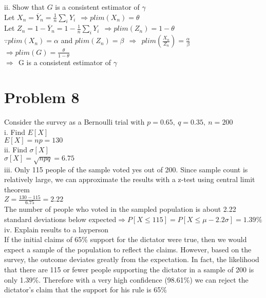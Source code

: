 \documentclass[11pt, oneside]{article}   	%
\begin{document}
ii. Show that $G$ is a consistent estimator of $\gamma$\\
Let $X_n=\overline{Y}_n=\frac{1}{n}\sum_i Y_i\ \ \Rightarrow plim(X_n)=\theta$\\
Let $Z_n=1-\overline{Y}_n=1-\frac{1}{n}\sum_i Y_i\ \ \Rightarrow plim(Z_n)=1-\theta$\\
\indent$\because plim(X_n)=\alpha$ and $plim(Z_n)=\beta\ \ \Rightarrow\ \ plim(\frac{X_n}{Z_n})=\frac{\alpha}{\beta}$\\
\indent$\Rightarrow plim(G)=\frac{\theta}{1-\theta}$\\
\indent$\Rightarrow\ \ $G is a consistent estimator of $\gamma$\\

\section{Problem 8}
Consider the survey as a Bernoulli trial with $p=0.65,\ q=0.35,\ n=200$\\

i. Find $E[X]$\\
$E[X]=np=130$\\

ii. Find $\sigma[X]$\\
$\sigma[X]=\sqrt{npq}=6.75$\\

iii. Only 115 people of the sample voted yes out of 200. Since sample count is relatively large, we can approximate the results with a z-test using central limit theorem\\
$Z=\frac{130-115}{6.75}=2.22$\\ The number of people who voted in the sampled population is about 2.22 standard deviations below expected$\Rightarrow P[X\leq 115]=P[X\leq \mu-2.2\sigma]=1.39\%$\\

iv. Explain results to a layperson\\
If the initial claims of 65\% support for the dictator were true, then we would expect a sample of the population to reflect the claims. However, based on the survey, the outcome deviates greatly from the expectation. In fact, the likelihood that there are 115 or fewer people supporting the dictator in a sample of 200 is only 1.39\%. Therefore with a very high confidence (98.61\%) we can reject the dictator's claim that the support for his rule is 65\%

\end{document}
